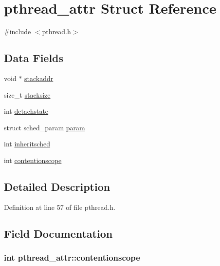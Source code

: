 \hypertarget{structpthread__attr}{\section{pthread\+\_\+attr Struct Reference}
\label{structpthread__attr}
}


{\ttfamily \#include $<$pthread.\+h$>$}

\subsection*{Data Fields}
\begin{DoxyCompactItemize}
\item 
void $\ast$ \hyperlink{structpthread__attr_a004b9c2b7c75177f4de0262277f48333}{stackaddr}
\item 
size\+\_\+t \hyperlink{structpthread__attr_a8b8eaabf2bc9b4cec33d7764bbb115d9}{stacksize}
\item 
int \hyperlink{structpthread__attr_a2ac0f3f9d4513024bbafc7db17c25a46}{detachstate}
\item 
struct sched\+\_\+param \hyperlink{structpthread__attr_a371c70c9e51a2444860395f7045bbd3e}{param}
\item 
int \hyperlink{structpthread__attr_ab6bef83bc858c0ffb3c8d0b461ba4396}{inheritsched}
\item 
int \hyperlink{structpthread__attr_a1d5ca4923f6814d754208080896a360a}{contentionscope}
\end{DoxyCompactItemize}


\subsection{Detailed Description}


Definition at line 57 of file pthread.\+h.



\subsection{Field Documentation}
\hypertarget{structpthread__attr_a1d5ca4923f6814d754208080896a360a}{
\subsubsection[{contentionscope}]{\setlength{\rightskip}{0pt plus 5cm}int pthread\+\_\+attr\+::contentionscope}}\label{structpthread__attr_a1d5ca4923f6814d754208080896a360a}


